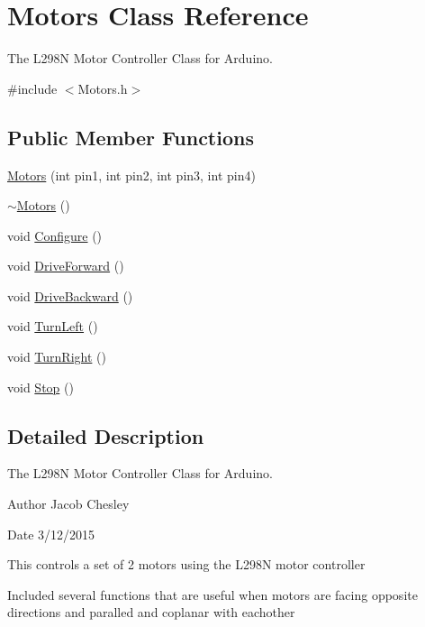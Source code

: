 \hypertarget{class_motors}{}\section{Motors Class Reference}
\label{class_motors}


The L298\+N Motor Controller Class for Arduino.  




{\ttfamily \#include $<$Motors.\+h$>$}

\subsection*{Public Member Functions}
\begin{DoxyCompactItemize}
\item 
\hyperlink{class_motors_aace1b69a19413c5d38dd203550b06bd5}{Motors} (int pin1, int pin2, int pin3, int pin4)
\item 
\hyperlink{class_motors_ab9d527a65397c54bd24c364b22b31317}{$\sim$\+Motors} ()
\item 
void \hyperlink{class_motors_a2e52af966b6baf287160948bb74f8b11}{Configure} ()
\item 
void \hyperlink{class_motors_a0eb037c35436f6687910407eb490bf28}{Drive\+Forward} ()
\item 
void \hyperlink{class_motors_aeddfda1a66ef545f02c8f5f6a31a9285}{Drive\+Backward} ()
\item 
void \hyperlink{class_motors_a108b243a514918461f19ff5fdd86f560}{Turn\+Left} ()
\item 
void \hyperlink{class_motors_af78dff344c31c67be70498428ce61b89}{Turn\+Right} ()
\item 
void \hyperlink{class_motors_abfecdef2716a275d5740572db585576c}{Stop} ()
\end{DoxyCompactItemize}


\subsection{Detailed Description}
The L298\+N Motor Controller Class for Arduino. 

\begin{DoxyAuthor}{Author}
Jacob Chesley 
\end{DoxyAuthor}
\begin{DoxyDate}{Date}
3/12/2015
\end{DoxyDate}
This controls a set of 2 motors using the L298\+N motor controller

Included several functions that are useful when motors are facing opposite directions and paralled and coplanar with eachother

